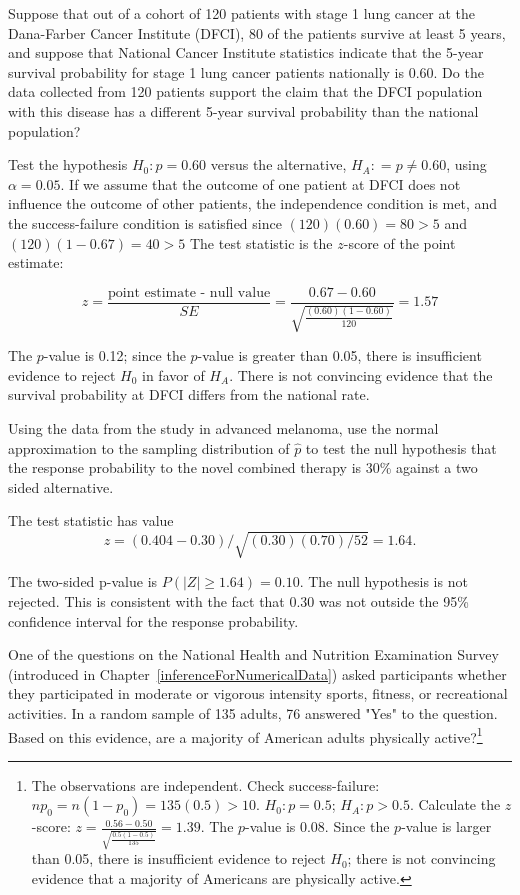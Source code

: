 \begin{example}{Suppose that out of a cohort of 120 patients with stage 1 lung cancer at the Dana-Farber Cancer Institute (DFCI), 80 of the patients survive at least 5 years, and suppose that National Cancer Institute statistics indicate that the 5-year survival probability for stage 1 lung cancer patients nationally is 0.60. Do the data collected from 120 patients support the claim that the DFCI population with this disease has a different 5-year survival probability than the national population?}

Test the hypothesis $H_0: p = 0.60$ versus the alternative, $H_A: = p \neq 0.60$, using $\alpha = 0.05$. If we assume that the outcome of one patient at DFCI does not influence the outcome of other patients, the independence condition is met, and the success-failure condition is satisfied since $(120)(0.60) = 80 > 5$ and $(120)(1-0.67) = 40 > 5$ The test statistic is the $z$-score of the point estimate: 

\[z = \dfrac{\text{point estimate - null value}}{SE} = \dfrac{0.67 - 0.60}{\sqrt{\frac{(0.60)(1-0.60)}{120}}} = 1.57 \]

The $p$-value is 0.12; since the $p$-value is greater than 0.05, there is insufficient evidence to reject $H_0$ in favor of $H_A$. There is not convincing evidence that the survival probability at DFCI differs from the national rate.

\end{example}

\begin{example} {Using the data from the study in advanced melanoma, use the normal approximation to the sampling distribution of $\hat{p}$ to test the null hypothesis that the response probability to the novel combined therapy is 30\% against a two sided alternative.}

The test statistic has value 
\[
z = (0.404 - 0.30)/\sqrt{(0.30)(0.70)/52} = 1.64. 
\] 

The two-sided p-value is $P(|Z| \geq 1.64) = 0.10$. The null hypothesis is not rejected.  This is consistent with the fact that 0.30 was not outside the 95\% confidence interval for the response probability.

\end{example}

\begin{exercise} One of the questions on the National Health and Nutrition Examination Survey (introduced in Chapter~\ref{inferenceForNumericalData}) asked participants whether they participated in moderate or vigorous intensity sports, fitness, or recreational activities. In a random sample of 135 adults, 76 answered "Yes" to the question. Based on this evidence, are a majority of American adults physically active?\footnote{The observations are independent. Check success-failure: $np_0 = n(1-p_0) = 135(0.5) > 10$. $H_0: p = 0.5$; $H_A: p > 0.5$. Calculate the $z$-score: $z = \frac{0.56 - 0.50}{\sqrt{\frac{0.5(1-0.5)}{135}}} = 1.39$. The $p$-value is 0.08. Since the $p$-value is larger than 0.05, there is insufficient evidence to reject $H_0$; there is not convincing evidence that a majority of Americans are physically active.}
\end{exercise}



